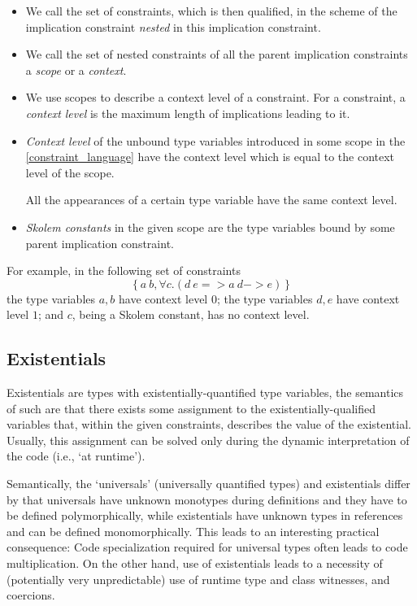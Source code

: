 \begin{defn}[Naming]
    \begin{itemize}
        \item We call the set of constraints, which is then qualified, in the scheme of the implication constraint \emph{nested} in this implication constraint.

        \item We call the set of nested constraints of all the parent implication constraints a \emph{scope} or a \emph{context}.

        \item We use scopes to describe a context level of a constraint. For a constraint, a \emph{context level} is the maximum length of implications leading to it.

        \item \emph{Context level} of the unbound type variables introduced in some scope in the \cref{constraint_language} have the context level which is equal to the context level of the scope. \label{constness_level}

        All the appearances of a certain type variable have the same context level.

        \item \emph{Skolem constants} in the given scope are the type variables bound by some parent implication constraint.
    \end{itemize}
\end{defn}

For example, in the following set of constraints
\[ \left\{ a ~ b, \forall c. (d ~ e => a ~ d -> e) \right\} \]
the type variables $a, b$ have context level $0$; the type variables $d, e$ have context level $1$; and $c$, being a Skolem constant, has no context level.

\subsection{Existentials}

\label{existentials}

Existentials are types with existentially-quantified type variables, the semantics of such are that there exists some assignment to the existentially-qualified variables that, within the given constraints, describes the value of the existential. Usually, this assignment can be solved only during the dynamic interpretation of the code (i.e., `at runtime').

Semantically, the `universals' (universally quantified types) and existentials differ by that universals have unknown monotypes during definitions and they have to be defined polymorphically, while existentials have unknown types in references and can be defined monomorphically. This leads to an interesting practical consequence: Code specialization required for universal types often leads to code multiplication. On the other hand, use of existentials leads to a necessity of (potentially very unpredictable) use of runtime type and class witnesses, and coercions.

